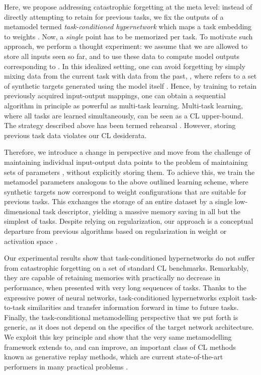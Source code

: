 \documentclass{article}
\begin{document}
Here, we propose addressing catastrophic forgetting at the meta level: instead of directly attempting to retain  for previous tasks, we fix the outputs of a metamodel  termed \emph{task-conditioned hypernetwork} which maps a task embedding  to weights . Now, a \emph{single} point has to be memorized per task. To motivate such approach, we perform a thought experiment: we assume that we are allowed to store all inputs  seen so far, and to use these data to compute model outputs corresponding to . In this idealized setting, one can avoid forgetting by simply mixing data from the current task with data from the past, , where  refers to a set of synthetic targets generated using the model itself . Hence, by training to retain previously acquired input-output mappings, one can obtain a sequential algorithm in principle as powerful as multi-task learning. Multi-task learning, where all tasks are learned simultaneously, can be seen as a CL upper-bound. The strategy described above has been termed rehearsal \citep{robins_catastrophic_1995}. However, storing previous task data violates our CL desiderata.

Therefore, we introduce a change in perspective and move from the challenge of maintaining individual input-output data points to the problem of maintaining sets of parameters , without explicitly storing them. To achieve this, we train the metamodel parameters  analogous to the above outlined learning scheme, where synthetic targets now correspond to weight configurations that are suitable for previous tasks. This exchanges the storage of an entire dataset by a single low-dimensional task descriptor, yielding a massive memory saving in all but the simplest of tasks. Despite relying on regularization, our approach is a conceptual departure from previous algorithms based on regularization in weight \citep[e.g.,][]{kirkpatrick_overcoming_2017,zenke_continual_2017} or activation space \citep[e.g.,][]{he_overcoming_2017}.

Our experimental results show that task-conditioned hypernetworks do not suffer from catastrophic forgetting on a set of standard CL benchmarks. Remarkably, they are capable of retaining memories with practically no decrease in performance, when presented with very long sequences of tasks. Thanks to the expressive power of neural networks, task-conditioned hypernetworks exploit task-to-task similarities and transfer information forward in time to future tasks. Finally, the task-conditional metamodelling perspective that we put forth is generic, as it does not depend on the specifics of the target network architecture. We exploit this key principle and show that the very same metamodelling framework extends to, and can improve, an important class of CL methods known as generative replay methods, which are current state-of-the-art performers in many practical problems \citep{shin_continual_2017,wu_memory_2018,van_de_ven_generative_2018}.
\end{document}
